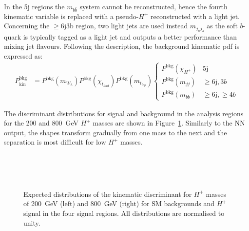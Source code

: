 In the 5j regions the $m_{b\bar{b}}$ system cannot be reconstructed, hence the fourth kinematic variable is replaced with a pseudo-$H^+$ reconstructed with a light jet. Concerning the $\geq$6j3b region, two light jets are used instead $m_{j_hj_4}$ as the soft $b$-quark is typically tagged as a light jet and outputs a better performance than mixing jet flavours. Following the description, the background kinematic pdf is expressed as:
\begin{align}
    P_{\text{kin}}^{\text{bkg}}&=P^{\text{bkg}}(m_{W_h})P^{\text{bkg}}(\chi_{t_{had}})P^{\text{bkg}}(m_{t_{lep}})\begin{cases}P^{\text{bkg}}(\chi_{H^+}) & 5\text{j} \\ P^{\text{bkg}}(m_{jj})&\geq6\text{j},3b\\P^{\text{bkg}}(m_{bb})& \geq6\text{j},\geq4b\end{cases}
\end{align}

The discriminant distributions for signal and background in the analysis regions for the 200 and 800~GeV $H^+$ masses are shown in Figure~\ref{Hplustb:Discriminantshapes}. Similarly to the NN output, the shapes transform gradually from one mass to the next and the separation is most difficult for low $H^+$ masses.

\begin{figure}[htb]
    \RawFloats
    \centering
    \\
    \\
    \\
    \caption{Expected distributions of the kinematic discriminant for $H^+$ masses of 200~GeV (left)
    and 800~GeV (right) for SM backgrounds and $H^+$ signal in the four signal regions.
    All distributions are normalised to unity.
    }
    \label{Hplustb:Discriminantshapes}
\end{figure}
\clearpage